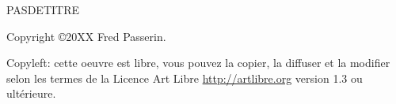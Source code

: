 
\textsc{PASDETITRE}

\vspace{\baselineskip}

Copyright \copyright 20XX Fred Passerin.

\vspace{\baselineskip}

\vspace{\baselineskip}
Copyleft: cette oeuvre est libre, vous pouvez la copier, la diffuser et la 
modifier selon les termes de la Licence Art Libre
\url{http://artlibre.org} version 1.3 ou ultérieure.
